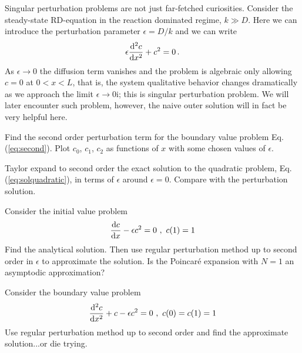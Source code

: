 Singular perturbation problems are not just far-fetched curiosities. 
Consider the steady-state RD-equation in the reaction dominated regime, $k \gg D$. 
Here we can introduce the perturbation parameter $\epsilon = D/k$ and we can write
\begin{equation}
  \label{eq:second-singular}
  \epsilon \frac{\mathrm{d}^2c}{\mathrm{d} x^2} + c^2 = 0 \, . 
\end{equation}
As $\epsilon \rightarrow 0$ the diffusion term vanishes and the problem is algebraic only 
allowing $c=0$ at $0 < x < L$, that is, the system qualitative behavior changes dramatically as we 
approach the limit $\epsilon \rightarrow 0$i; this is singular perturbation problem. 
We will later encounter such problem, however, the naive outer solution will in
fact be very helpful here.  

\begin{exerciseregion}

\begin{exercise}
  Find the second order perturbation term for the boundary value problem
  Eq. (\ref{eq:second}). Plot $c_0$, $c_1$, $c_2$ as functions of $x$ with some
  chosen values of $\epsilon$.
\end{exercise}

\begin{exercise}
	Taylor expand to second order 
	the exact solution to the quadratic problem, Eq. (\ref{eq:solquadratic}), 
	in terms of $\epsilon$ around $\epsilon=0$. Compare with the perturbation solution. 
\end{exercise}

\begin{exercise}
  Consider the initial value problem
  \begin{equation}
    \frac{\d c}{\d x} - \epsilon c^2 = 0 \ , \ c(1)=1
  \end{equation}
  	Find the analytical solution. Then use regular perturbation method
  up to second order in $\epsilon$ to approximate the solution. Is the 
  Poincar\'{e} expansion with $N=1$ an asymptodic approximation?		
\end{exercise}

\begin{exercise}
  Consider the boundary value problem
  \begin{equation}
    \frac{\mathrm{d}^2 c}{\mathrm{d} x^2} + c - \epsilon c^2 = 0 \ , \ c(0)=c(1)=1
  \end{equation}
  Use regular perturbation method up to second order and find the
  approximate solution...or die trying.
\end{exercise}


\end{exerciseregion}
